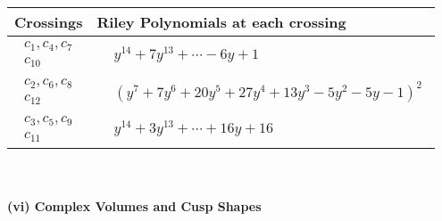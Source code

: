 \documentclass[1p]{elsarticle_modified}
\theoremstyle{definition}
\begin{document}
\begin{tabular}{m{50pt}|m{274pt}}
Crossings & \hspace{64pt}Riley Polynomials at each crossing \\
\hline $$\begin{aligned}c_{1},c_{4},c_{7}\\c_{10}\end{aligned}$$&$\begin{aligned}
&y^{14}+7 y^{13}+\cdots-6 y+1
\end{aligned}$\\
\hline $$\begin{aligned}c_{2},c_{6},c_{8}\\c_{12}\end{aligned}$$&$\begin{aligned}
&(y^7+7 y^6+20 y^5+27 y^4+13 y^3-5 y^2-5 y-1)^2
\end{aligned}$\\
\hline $$\begin{aligned}c_{3},c_{5},c_{9}\\c_{11}\end{aligned}$$&$\begin{aligned}
&y^{14}+3 y^{13}+\cdots+16 y+16
\end{aligned}$\\
\hline
\end{tabular}\\~\\
\newpage\flushleft \textbf{(vi) Complex Volumes and Cusp Shapes}
\end{document}
